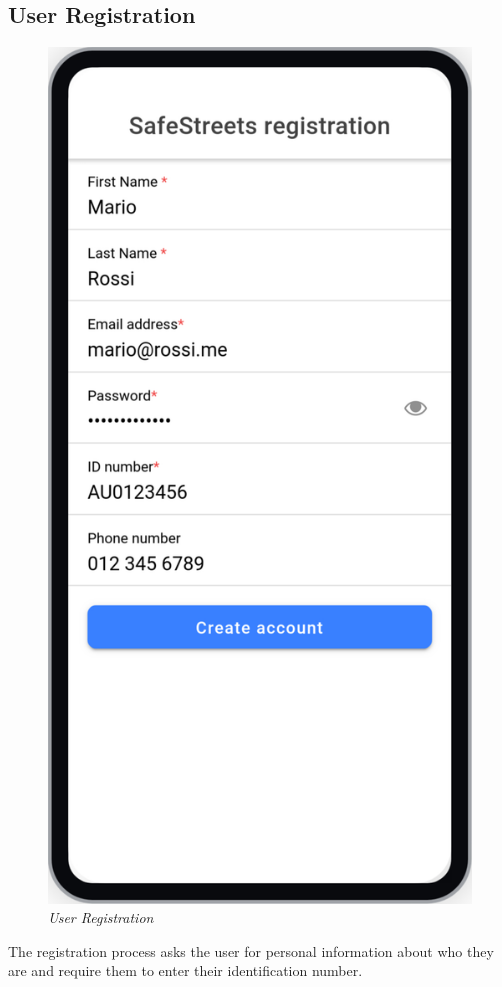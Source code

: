 \subsection{User Registration}
\begin{figure}[H]
  \centering
  \includegraphics[origin=c,width=\textwidth,height=.90\textheight,keepaspectratio]{DD_Images/UserInterface/Registration.jpg}
  \caption{\textit{User Registration}}
\end{figure}

The registration process asks the user for personal information about who they are and require them to enter
their identification number.